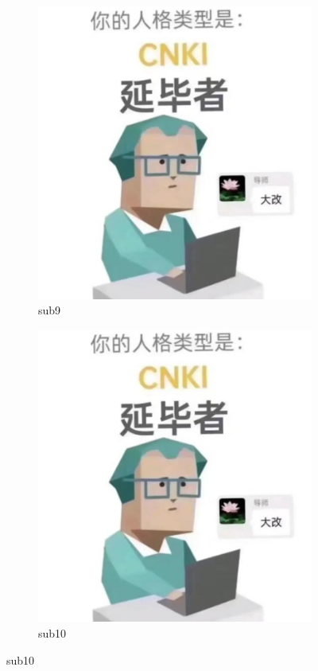 \begin{figure}[!ht]\ContinuedFloat \centering
	\begin{subfigure}[b]{0.49\textwidth}\centering
		\includegraphics[width=\textwidth]{./Graphs/example/example.jpeg}
		\caption{sub9}\label{subf::sub9}
	\end{subfigure}\hfill %
	\begin{subfigure}[b]{0.49\textwidth}\centering
		\includegraphics[width=\textwidth]{./Graphs/example/example.jpeg}
		\caption{sub10}\label{subf::sub10}
	\end{subfigure}
\end{figure}
